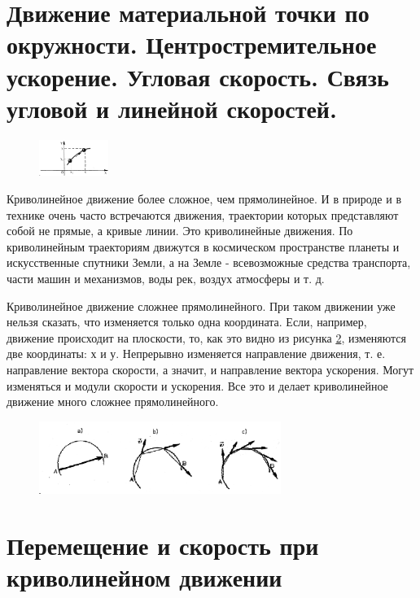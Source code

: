 \documentclass[a6paper, 11pt]{diss_4}
\renewcommand{\'}{\,'}
\begin{document}
\section{Движение материальной точки по окружности. Центростремительное ускорение. Угловая скорость. Связь угловой и линейной скоростей.}
\begin{figure}
\includegraphics[width=0.2\textwidth]{img/img16.eps}
\caption{}
\label{kr_l}
\end{figure}

  Криволинейное движение более сложное, чем прямолинейное. И в природе и
в технике очень часто встречаются движения, траектории которых представляют
собой не прямые, а кривые линии. Это криволинейные движения. По криволинейным
траекториям движутся в космическом пространстве планеты и искусственные
спутники Земли, а на Земле - всевозможные средства транспорта, части машин и
механизмов, воды рек, воздух атмосферы и т. д.

  Криволинейное движение сложнее прямолинейного. При таком движении уже
нельзя сказать, что изменяется только одна координата. Если, например, движение
происходит на плоскости, то, как это видно из рисунка \ref{img_18}, изменяются две
координаты: $х$ и $у$. Непрерывно изменяется направление движения, т. е.
направление вектора скорости, а значит, и направление вектора ускорения. Могут
изменяться и модули скорости и ускорения. Все это и делает криволинейное
движение много сложнее прямолинейного.

\begin{figure}[h!]
\begin{center}
  \includegraphics[width=0.7\textwidth]{img/img18.eps}\\
\end{center}
  \caption{}\label{img_18}
\end{figure}

\section{Перемещение и скорость при криволинейном движении}
\end{document}
